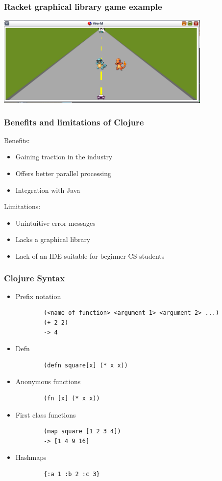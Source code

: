 \documentclass{beamer}
\begin{document}
\begin{frame}
\frametitle{Racket graphical library game example}
\begin{center}
\includegraphics[width=300pt]{racketGameExample}
\end{center}
\end{frame}

\begin{frame}
\frametitle{Benefits and limitations of Clojure}
Benefits:
\begin{itemize}
\item Gaining traction in the industry
\item Offers better parallel processing
\item Integration with Java
\end{itemize}
Limitations:
\begin{itemize}
\item Unintuitive error messages
\item Lacks a graphical library
\item Lack of an IDE suitable for beginner CS students
\end{itemize}
\end{frame}

\begin{frame}[fragile]
\frametitle{Clojure Syntax}
\begin{itemize}
	\item Prefix notation			
	\begin{verbatim}
		(<name of function> <argument 1> <argument 2> ...)
		(+ 2 2)
		-> 4
	\end{verbatim}
	\item Defn
	\begin{verbatim}
		(defn square[x] (* x x))
	\end{verbatim}
	\item Anonymous functions
	\begin{verbatim}
		(fn [x] (* x x))
	\end{verbatim}
	\item First class functions
	\begin{verbatim}
		(map square [1 2 3 4])
		-> [1 4 9 16]
	\end{verbatim}
	\item Hashmaps
	\begin{verbatim}
	 	{:a 1 :b 2 :c 3}
	\end{verbatim}
\end{itemize}
\end{frame}
\end{document}
